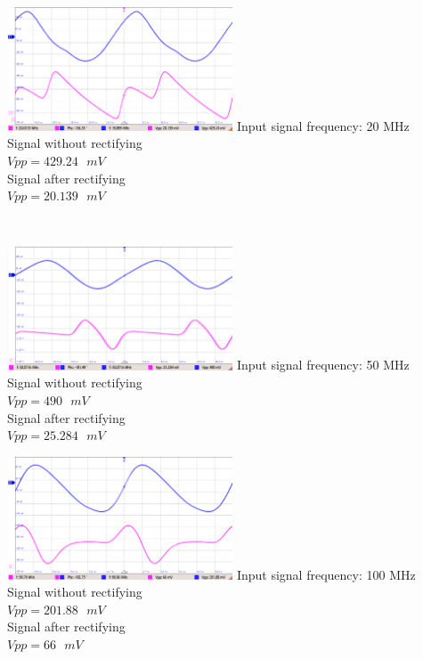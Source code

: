 \documentclass[12pt,a4paper,bold]{thesis}
\theoremstyle{thm}
\theoremstyle{definition}
\begin{document}
\hfill
\begin{minipage}[b]{0.48\linewidth}
\includegraphics[width=6.7cm]{Images/Infinion/RF20MHz.png}  
Input signal frequency: 20 MHz\\
Signal without rectifying\\
$Vpp = 429.24\text{ }mV$\\
Signal after rectifying\\
$Vpp = 20.139\text{ }mV$\\
\end{minipage}
\\
\begin{minipage}[b]{0.48\linewidth}
\includegraphics[width=6.7cm]{Images/Infinion/RF50MHz.png}  
Input signal frequency: 50 MHz\\
Signal without rectifying\\
$Vpp = 490\text{ }mV$\\
Signal after rectifying\\
$Vpp = 25.284\text{ }mV$\\
\end{minipage}
\hfill
\begin{minipage}[b]{0.48\linewidth}
\includegraphics[width=6.7cm]{Images/Infinion/RF100MHz.png}  
Input signal frequency: 100 MHz\\
Signal without rectifying\\
$Vpp = 201.88\text{ }mV$\\
Signal after rectifying\\
$Vpp = 66\text{ }mV$\\
\end{minipage}
\end{document}
